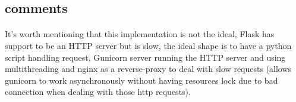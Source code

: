 \documentclass{article}
\begin{document}
\subsection{comments}
\paragraph{}
It's worth mentioning that this implementation is not the ideal, Flask has support to be an HTTP server but is slow, the ideal shape is to have a python script handling request, Gunicorn server running the HTTP server and using multithreading and nginx as a reverse-proxy to deal with slow requests (allows gunicorn to work asynchronously without having resources lock due to bad connection when dealing with those http requests).
\end{document}
